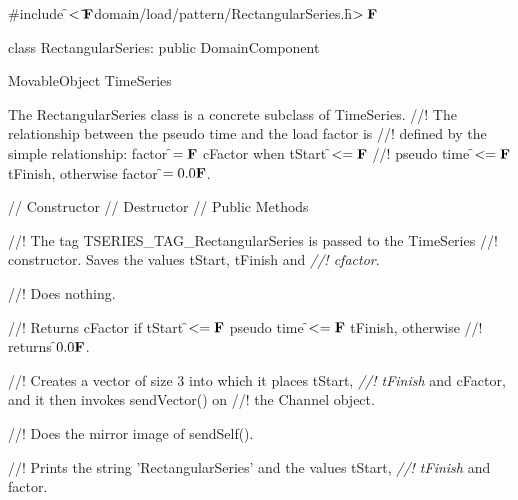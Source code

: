 
\indent \#include \f$<\tilde{ }{\bf F}$domain/load/pattern/RectangularSeries.h\f$>{\bf F}$

\indent class RectangularSeries: public DomainComponent

\indent MovableObject
\indent\indent TimeSeries
\indent\indent{}

\indent The RectangularSeries class is a concrete subclass of TimeSeries.
//! The relationship between the pseudo time and the load factor is
//! defined by the simple relationship: factor \f$={\bf F}$ cFactor when tStart \f$<={\bf F}$
//! pseudo time \f$<={\bf F}$ tFinish, otherwise factor \f$ =0.0{\bf F}$.


\indent // Constructor 
\indent // Destructor 
\indent // Public Methods 

//! The tag TSERIES\_TAG\_RectangularSeries is passed to the TimeSeries
//! constructor. Saves the values \p tStart, \p tFinish and {\em
//! cfactor}.


//! Does nothing.

//! Returns cFactor if tStart \f$<={\bf F}$ pseudo time \f$<={\bf F}$ tFinish, otherwise
//! returns \f$0.0{\bf F}$. 

//! Creates a vector of size 3 into which it places \p tStart, {\em
//! tFinish} and \p cFactor, and it then invokes sendVector() on
//! the Channel object. 

//! Does the mirror image of sendSelf().

//! Prints the string 'RectangularSeries' and the values \p tStart, {\em
//! tFinish} and \p factor. 
